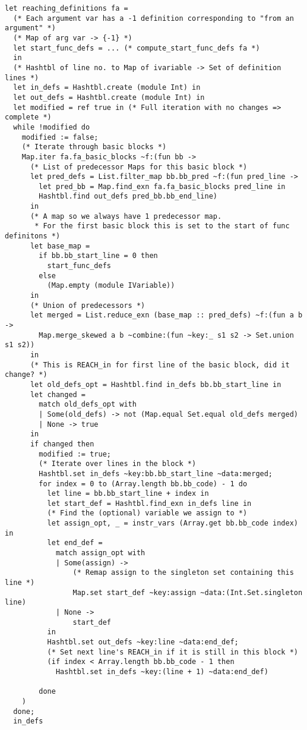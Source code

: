 \documentclass[12pt,notitlepage]{report}
\begin{document}
\begin{verbatim}
let reaching_definitions fa =
  (* Each argument var has a -1 definition corresponding to "from an argument" *)
  (* Map of arg var -> {-1} *)
  let start_func_defs = ... (* compute_start_func_defs fa *)
  in
  (* Hashtbl of line no. to Map of ivariable -> Set of definition lines *)
  let in_defs = Hashtbl.create (module Int) in
  let out_defs = Hashtbl.create (module Int) in
  let modified = ref true in (* Full iteration with no changes => complete *)
  while !modified do
    modified := false;
    (* Iterate through basic blocks *)
    Map.iter fa.fa_basic_blocks ~f:(fun bb ->
      (* List of predecessor Maps for this basic block *)
      let pred_defs = List.filter_map bb.bb_pred ~f:(fun pred_line ->
        let pred_bb = Map.find_exn fa.fa_basic_blocks pred_line in
        Hashtbl.find out_defs pred_bb.bb_end_line)
      in
      (* A map so we always have 1 predecessor map.
       * For the first basic block this is set to the start of func definitons *)
      let base_map =
        if bb.bb_start_line = 0 then
          start_func_defs
        else
          (Map.empty (module IVariable))
      in
      (* Union of predecessors *)
      let merged = List.reduce_exn (base_map :: pred_defs) ~f:(fun a b ->
        Map.merge_skewed a b ~combine:(fun ~key:_ s1 s2 -> Set.union s1 s2))
      in
      (* This is REACH_in for first line of the basic block, did it change? *)
      let old_defs_opt = Hashtbl.find in_defs bb.bb_start_line in
      let changed =
        match old_defs_opt with
        | Some(old_defs) -> not (Map.equal Set.equal old_defs merged)
        | None -> true
      in
      if changed then
        modified := true;
        (* Iterate over lines in the block *)
        Hashtbl.set in_defs ~key:bb.bb_start_line ~data:merged;
        for index = 0 to (Array.length bb.bb_code) - 1 do
          let line = bb.bb_start_line + index in
          let start_def = Hashtbl.find_exn in_defs line in
          (* Find the (optional) variable we assign to *)
          let assign_opt, _ = instr_vars (Array.get bb.bb_code index) in
          let end_def =
            match assign_opt with
            | Some(assign) ->
                (* Remap assign to the singleton set containing this line *)
                Map.set start_def ~key:assign ~data:(Int.Set.singleton line)
            | None ->
                start_def
          in
          Hashtbl.set out_defs ~key:line ~data:end_def;
          (* Set next line's REACH_in if it is still in this block *)
          (if index < Array.length bb.bb_code - 1 then
            Hashtbl.set in_defs ~key:(line + 1) ~data:end_def)

        done
    )
  done;
  in_defs
\end{verbatim}
\end{document}

